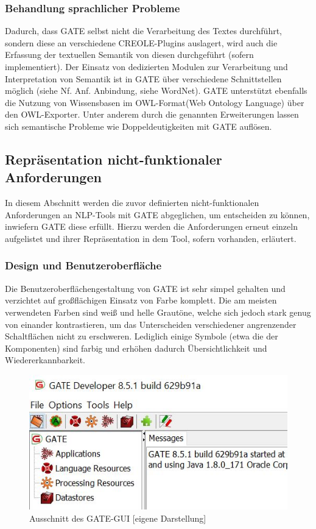 \documentclass[12pt]{report}
\begin{document}
\subsubsection{Behandlung sprachlicher Probleme} 
Dadurch, dass GATE selbst nicht die Verarbeitung des Textes durchführt, sondern diese an verschiedene CREOLE-Plugins auslagert, wird auch die Erfassung der textuellen Semantik von diesen durchgeführt (sofern implementiert). Der Einsatz von dedizierten Modulen zur Verarbeitung und Interpretation von Semantik ist in GATE über verschiedene Schnittstellen möglich (siehe Nf. Anf. Anbindung, siehe WordNet). GATE unterstützt ebenfalls die Nutzung von Wissensbasen im OWL-Format(Web Ontology Language) über den OWL-Exporter. Unter anderem durch die genannten Erweiterungen lassen sich semantische Probleme wie Doppeldeutigkeiten mit GATE auflösen.

\subsection{Repräsentation nicht-funktionaler Anforderungen}
In diesem Abschnitt werden die zuvor definierten nicht-funktionalen Anforderungen an NLP-Tools mit GATE abgeglichen, um entscheiden zu können, inwiefern GATE diese erfüllt. Hierzu werden die Anforderungen erneut einzeln aufgelistet und ihrer Repräsentation in dem Tool, sofern vorhanden, erläutert. 

\subsubsection{Design und Benutzeroberfläche}

Die Benutzeroberflächengestaltung von GATE ist sehr simpel gehalten und verzichtet auf großflächigen Einsatz von Farbe komplett. Die am meisten verwendeten Farben sind weiß und helle Grautöne, welche sich jedoch stark genug von einander kontrastieren, um das Unterscheiden verschiedener angrenzender Schaltflächen nicht zu erschweren. Lediglich einige Symbole (etwa die der Komponenten) sind farbig und erhöhen dadurch Übersichtlichkeit und Wiedererkannbarkeit. 

\begin{figure}[h!]
\begin{center}
\includegraphics[scale=1]{GATE_Bilder/GUI-Ausschnitt.jpg}
\caption{Ausschnitt des GATE-GUI [eigene Darstellung]}
\end{center}
\end{figure}
\end{document}
